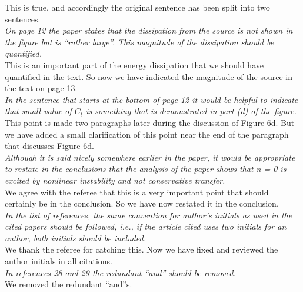 \documentclass[12pt]{article}
\begin{document}
{\noindent This is true, and accordingly the original sentence has been split into two sentences. }\\

{\noindent \itshape   On page 12 the paper states that the dissipation from the source is not shown in the
figure but is “rather large”. This magnitude of the dissipation should be quantified. }\\

{\noindent This is an important part of the energy dissipation that we should have quantified in the text. So now we have indicated the magnitude of the source in the text on page 13. }\\

{\noindent \itshape   In the sentence that starts at the bottom of page 12 it would be helpful to indicate that
small value of $C_t$ is something that is demonstrated in part (d) of the figure. }\\

{\noindent This point is made two paragraphs later during the discussion of Figure 6d. But we have added a small clarification of this point near the end of the paragraph that discusses Figure 6d. }\\

{\noindent \itshape   Although it is said nicely somewhere earlier in the paper, it would be appropriate to
restate in the conclusions that the analysis of the paper shows that n = 0 is excited by
nonlinear instability and not conservative transfer. }\\

{\noindent We agree with the referee that this is a very important point that should certainly be in the conclusion. So we have now restated it in the conclusion. }\\

{\noindent \itshape  In the list of references, the same convention for author’s initials as used in the cited
papers should be followed, i.e., if the article cited uses two initials for an author, both
initials should be included. }\\

{\noindent We thank the referee for catching this. Now we have fixed and reviewed the author initials in all citations. }\\

{\noindent \itshape In references 28 and 29 the redundant “and” should be removed. }\\

{\noindent We removed the redundant ``and''s. }\\
\end{document}
